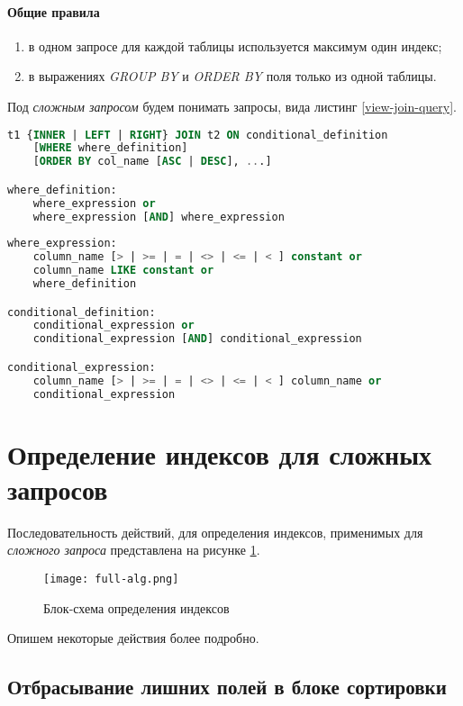 \paragraph{Общие правила}

\begin{enumerate}
\item в одном запросе для каждой таблицы используется максимум один индекс;
\item в выражениях \textit{GROUP BY} и \textit{ORDER BY} поля только из одной таблицы.
\end{enumerate}


Под \textit{сложным запросом} будем понимать запросы, вида листинг \ref{view-join-query}.

\begin{lstlisting}[language=sql, caption={Вид сложного запроса},label=view-join-query]
t1 {INNER | LEFT | RIGHT} JOIN t2 ON conditional_definition
    [WHERE where_definition]
    [ORDER BY col_name [ASC | DESC], ...]

where_definition:
    where_expression or 
    where_expression [AND] where_expression 
    
where_expression:
    column_name [> | >= | = | <> | <= | < ] constant or
    column_name LIKE constant or 
    where_definition   

conditional_definition:
    conditional_expression or 
    conditional_expression [AND] conditional_expression 

conditional_expression:
    column_name [> | >= | = | <> | <= | < ] column_name or
    conditional_expression
\end{lstlisting}

\section{Определение индексов для сложных запросов}

Последовательность действий, для определения индексов, применимых для \textit{сложного запроса} представлена на рисунке \ref{img:full-alg}.

\begin{figure}[h!]
  \centering
  \texttt{[image: full-alg.png]}
  \caption{Блок-схема определения индексов}
  \label{img:full-alg}
\end{figure}

\indent
Опишем некоторые действия более подробно.





\subsection{Отбрасывание лишних полей в блоке сортировки}

